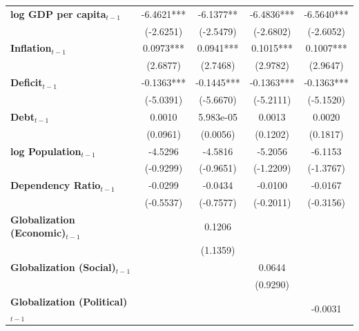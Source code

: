 \begin{center}
\begin{tabular}{lcccc}
\textbf{log GDP per capita$_{t-1}$}           &   -6.4621***   &    -6.1377**     &    -6.4836***    &    -6.5640***     \\
\textbf{ }                         &   (-2.6251)    &    (-2.5479)     &    (-2.6802)     &    (-2.6052)      \\
\textbf{Inflation$_{t-1}$}      &   0.0973***    &    0.0941***     &    0.1015***     &    0.1007***      \\
\textbf{ }                         &    (2.6877)    &     (2.7468)     &     (2.9782)     &     (2.9647)      \\
\textbf{Deficit$_{t-1}$}             &   -0.1363***   &    -0.1445***    &    -0.1363***    &    -0.1363***     \\
\textbf{ }                         &   (-5.0391)    &    (-5.6670)     &    (-5.2111)     &    (-5.1520)      \\
\textbf{Debt$_{t-1}$}                &     0.0010     &    5.983e-05     &      0.0013      &      0.0020       \\
\textbf{ }                         &    (0.0961)    &     (0.0056)     &     (0.1202)     &     (0.1817)      \\
\textbf{log Population$_{t-1}$}      &    -4.5296     &     -4.5816      &     -5.2056      &     -6.1153       \\
\textbf{ }                         &   (-0.9299)    &    (-0.9651)     &    (-1.2209)     &    (-1.3767)      \\
\textbf{Dependency Ratio$_{t-1}$}   &    -0.0299     &     -0.0434      &     -0.0100      &     -0.0167       \\
\textbf{ }                         &   (-0.5537)    &    (-0.7577)     &    (-0.2011)     &    (-0.3156)      \\
\textbf{Globalization (Economic)$_{t-1}$}             &                &      0.1206      &                  &                   \\
\textbf{ }                         &                &     (1.1359)     &                  &                   \\
\textbf{Globalization (Social)$_{t-1}$}             &                &                  &      0.0644      &                   \\
\textbf{ }                         &                &                  &     (0.9290)     &                   \\
\textbf{Globalization (Political)$_{t-1}$}             &                &                  &                  &     -0.0031       \\

\end{tabular}
\end{center}
